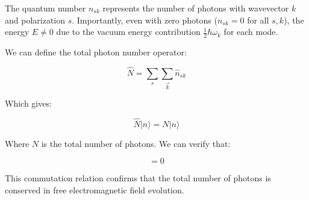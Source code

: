 The quantum number $n_{sk}$ represents the number of photons with wavevector $k$ and polarization $s$. Importantly, even with zero photons ($n_{sk}=0$ for all $s,k$), the energy $E\neq 0$ due to the vacuum energy contribution $\frac{1}{2}\hbar\omega_k$ for each mode.

We can define the total photon number operator:

\begin{equation}
\hat{N}=\sum_s\sum_{\vec{k}}\hat{n}_{sk}
\end{equation}

Which gives:

\begin{equation}
\hat{N}|n\rangle=N|n\rangle
\end{equation}

Where $N$ is the total number of photons. We can verify that:

\begin{equation}
[\hat{N},H]=0
\end{equation}

This commutation relation confirms that the total number of photons is conserved in free electromagnetic field evolution.

